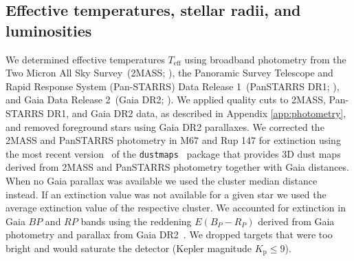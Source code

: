 \documentclass{aa}
\begin{document}
\subsection{Effective temperatures, stellar radii, and luminosities}
\label{TeffRL}
We determined effective temperatures $T_\mathrm{eff}$ using broadband photometry from the Two Micron All Sky Survey~(2MASS; \citealt{skrutskie_two_2006}), the Panoramic Survey Telescope and Rapid Response System \mbox{(Pan-STARRS)} Data Release 1~(PanSTARRS DR1; \citealt{2016arXiv161205560C}), and Gaia Data Release 2~(Gaia DR2; \citealt{gaia2016, gaia2018}). We applied quality cuts to 2MASS, Pan-STARRS DR1, and Gaia DR2 data, as described in Appendix \ref{app:photometry}, and removed foreground stars using Gaia DR2 parallaxes. We corrected the 2MASS and PanSTARRS photometry in M67 and Rup 147 for extinction using the most recent version~\citep{green2019} of the \texttt{dustmaps}~\citep{green_dustmaps_2018} package that provides 3D dust maps derived from 2MASS and PanSTARRS photometry together with Gaia distances. When no Gaia parallax was available we used the cluster median distance instead. If an extinction value was not available for a given star we used the average extinction value of the respective cluster. We accounted for extinction in Gaia $BP$ and $RP$ bands using the reddening $E(B_P-R_P)$ derived from Gaia photometry and parallax from Gaia DR2~\citep{andrae_gaiaapsis_2018}. We dropped targets that were too bright and would saturate the detector (Kepler magnitude $K_\mathrm{p} \leq 9$).
\end{document}
